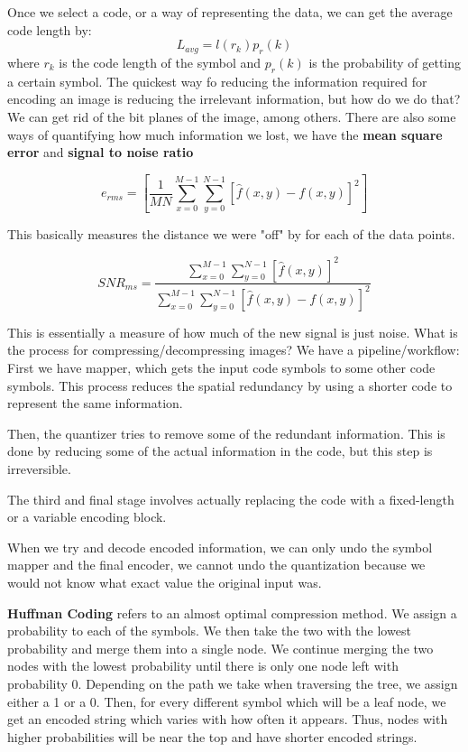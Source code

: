 \documentclass{tufte-handout}
\begin{document}
Once we select a code, or a way of representing the data, we can get the average code length
by:
\[L_{avg} = l(r_{k})p_{r}(k)\]
where $r_{k}$ is the code length of the symbol and $p_{r}(k)$ is the probability of getting
a certain symbol. The quickest way fo reducing the information required for encoding an image
is reducing the irrelevant information, but how do we do that? We can get rid of the 
bit planes of the image, among others. There are also some ways of quantifying how 
much information we lost, we have the \textbf{mean square error} and \textbf{signal to noise ratio}

\[e_{rms} = [\frac{1}{MN}\sum_{x=0}^{M-1}\sum_{y=0}^{N-1}[\hat{f}(x, y) - f(x, y)]^{2}]\]

This basically measures the distance we were "off" by for each of the data points.

\[SNR_{ms} = \frac{\sum_{x=0}^{M-1}\sum_{y=0}^{N-1}[\hat{f}(x, y)]^{2}}{\sum_{x=0}^{M-1}\sum_{y=0}^{N-1}[\hat{f}(x, y) - f(x, y)]^{2}}\]

This is essentially a measure of how much of the new signal is just noise.
What is the process for compressing/decompressing images? We have a pipeline/workflow:
First we have mapper, which gets the input code symbols to some other code symbols. This
process reduces the spatial redundancy by using a shorter code to represent the same information.

Then, the quantizer tries to remove some of the redundant information. This is done by reducing
some of the actual information in the code, but this step is irreversible. 

The third and final stage involves actually replacing the code with a fixed-length or a 
variable encoding block.

When we try and decode encoded information, we can only undo the symbol mapper and the final
encoder, we cannot undo the quantization because we would not know what exact value the 
original input was.

\textbf{Huffman Coding} refers to an almost optimal compression method. We assign a 
probability to each of the symbols. We then take the two with the lowest probability and 
merge them into a single node. We continue merging the two nodes with the lowest probability 
until there is only one node left with probability 0. Depending on the path we take when 
traversing the tree, we assign either a 1 or a 0. Then, for every different symbol which will
be a leaf node, we get an encoded string which varies with how often it appears. Thus,
nodes with higher probabilities will be near the top and have shorter encoded strings.
\end{document}
